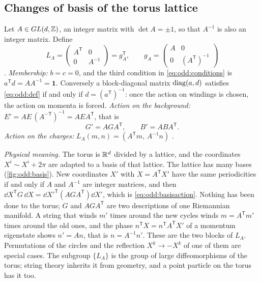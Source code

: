 \subsection{Changes of basis of the torus lattice}

Let $A\in GL(d,\mathbb{Z})$, an integer matrix with $\det A=\pm1$, so
that $A^{-1}$ is also an integer matrix. Define
\begin{equation}\label{eq:odd:basis}
 L_A=\begin{pmatrix}A^{\mathsf T}&0\\0&A^{-1}\end{pmatrix}=g_A^{\mathsf T},\qquad
 g_A=\begin{pmatrix}A&0\\0&(A^{\mathsf T})^{-1}\end{pmatrix}
\end{equation}
. \emph{Membership:} $b=c=0$, and the third
condition in \eqref{eq:odd:conditions} is $a^{\mathsf T}d=AA^{-1}=\mathbf 1$. Conversely a
block-diagonal matrix $\operatorname{diag}(a,d)$ satisfies \eqref{eq:odd:def} if and only if
$d=(a^{\mathsf T})^{-1}$: once the action on windings is chosen, the action on momenta is
forced. \emph{Action on the background:}
$E'=A E\,(A^{-\mathsf T})^{-1}=AEA^{\mathsf T}$, that is
\begin{equation}\label{eq:odd:basisaction}
 G'=AGA^{\mathsf T},\qquad B'=ABA^{\mathsf T}.
\end{equation}
\emph{Action on the charges:} $L_A(m,n)=(A^{\mathsf T}m,\,A^{-1}n)$ .

\emph{Physical meaning.} The torus is $\mathbb{R}^d$ divided by a lattice, and the coordinates
$X^i\sim X^i+2\pi$ are adapted to a basis of that lattice. The lattice has many bases
(\cref{fig:odd:basis}). New coordinates $X'$ with $X=A^{\mathsf T}X'$ have the same
periodicities if and only if $A$ and $A^{-1}$ are integer matrices, and then
$\dd X^{\mathsf T}G\,\dd X=\dd X'^{\mathsf T}(AGA^{\mathsf T})\dd X'$, which is
\eqref{eq:odd:basisaction}. Nothing has been done to the torus; $G$ and $AGA^{\mathsf T}$
are two descriptions of one Riemannian manifold. A string that winds $m'$ times around the
new cycles winds $m=A^{\mathsf T}m'$ times around the old ones, and the phase
$n^{\mathsf T}X=n^{\mathsf T}A^{\mathsf T}X'$ of a momentum eigenstate shows $n'=An$, that
is $n=A^{-1}n'$. These are the two blocks of $L_A$. Permutations of the circles and the
reflection $X^k\to-X^k$ of one of them are special cases. The subgroup $\{L_A\}$ is the
group of large diffeomorphisms of the torus; string theory inherits it from geometry, and
a point particle on the torus has it too.


